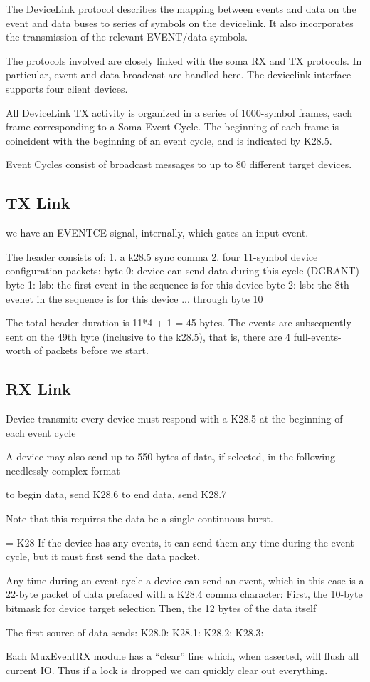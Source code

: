 
The DeviceLink protocol describes the mapping between events and
data on the event and data buses to series of symbols on the
devicelink. It also incorporates the transmission of the relevant
EVENT/data symbols.

The protocols involved are closely linked with the soma RX and TX
protocols. In particular, event and data broadcast are handled
here. The devicelink interface supports four client devices.

All DeviceLink TX activity is organized in a series of 1000-symbol
frames, each frame corresponding to a Soma Event Cycle. The beginning
of each frame is coincident with the beginning of an event cycle, and
is indicated by K28.5.

Event Cycles consist of broadcast messages to up to 80 different
target devices. 


\subsection{TX Link} 

we have an EVENTCE signal, internally, which gates an input event. 

The header consists of:
1. a k28.5 sync comma
2. four 11-symbol device configuration packets:
byte 0: device can send data during this cycle (DGRANT)
byte 1: lsb: the first event in the sequence is for this device
byte 2: lsb: the 8th evenet in the sequence is for this device
... through byte 10

The total header duration is 11*4 + 1 = 45 bytes. The events are
subsequently sent on the 49th byte (inclusive to the k28.5), that
is, there are 4 full-events-worth of packets before we start. 

\subsection{RX Link}

Device transmit:
every device must respond with a K28.5 at the beginning of each event cycle

A device may also send up to 550 bytes of data, if selected, in the following needlessly complex format

to begin data, send K28.6
to end data, send K28.7

Note that this requires the data be a single continuous burst. 

= K28
If the device has any events, it can send them any time during the event cycle, but it must first send the data packet. 

Any time during an event cycle a device can send an event, which in
this case is a 22-byte packet of data prefaced with a K28.4 comma
character:
  First, the 10-byte bitmask for device target selection
  Then, the 12 bytes of the data itself

The first source of data sends: 
K28.0: 
K28.1: 
K28.2: 
K28.3: 

Each MuxEventRX module has a ``clear'' line which, when asserted, will
flush all current IO. Thus if a lock is dropped we can quickly clear
out everything.
